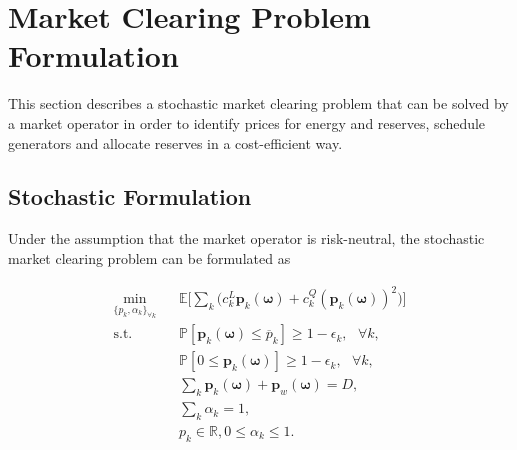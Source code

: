 \documentclass{article}
\begin{document}
\section{Market Clearing Problem Formulation}

This section describes a stochastic market clearing problem that can be solved by a market operator in order to identify prices for energy and reserves, schedule generators and allocate reserves in a cost-efficient way. 

\subsection{Stochastic Formulation}
Under the assumption that the market operator is risk-neutral, the stochastic market clearing problem can be formulated as

\begin{align}
\underset{\{p_k, \alpha_k\}_{\forall k}}{\min} \hspace{10pt} & \mathbb{E}\Big[\sum_k \big(c_k^L \mathbf{p}_k(\boldsymbol{\omega}) + c_k^Q (\mathbf{p}_k(\boldsymbol{\omega}))^2\big)\Big]\\
\mbox{s.t. } & \mathbb{P}[\mathbf{p}_k(\boldsymbol{\omega}) \le \overline{p}_k] \ge 1 - \epsilon_k, \mbox{ }\forall k,\\
& \mathbb{P}[0 \le \mathbf{p}_k(\boldsymbol{\omega})] \ge 1 - \epsilon_k, \mbox{ }\forall k,\\
& \sum_k \mathbf{p}_k(\boldsymbol{\omega}) + \mathbf{p}_w(\boldsymbol{\omega}) = D,\\
& \sum_k \alpha_k = 1, \\
& p_k \in \mathbb{R}, 0 \le \alpha_k \le 1.
\end{align}
\end{document}
